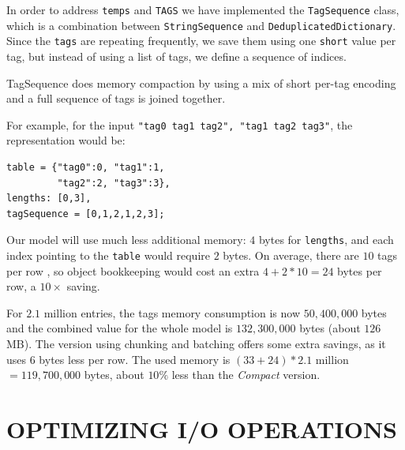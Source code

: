 \documentclass[a4paper,twoside]{article}
\begin{document}
In order to address {\texttt{temps}} and {\texttt{TAGS}} we have implemented the {\texttt{TagSequence}} class, which is a combination between {\texttt{StringSequence}} and {\texttt{DeduplicatedDictionary}}.
Since the {\texttt{tags}} are repeating frequently, we save them using one {\texttt{short}} value per tag, but instead of using a list of tags, we define a sequence of indices.

TagSequence does memory compaction by using a mix of short per-tag encoding and a full sequence of tags is joined together.

For example, for the input {\texttt{"tag0 tag1 tag2", "tag1 tag2 tag3"}}, the representation would be:
\begin{verbatim}
table = {"tag0":0, "tag1":1, 
         "tag2":2, "tag3":3},
lengths: [0,3], 
tagSequence = [0,1,2,1,2,3]; 
\end{verbatim}

Our model will use much less additional memory: $4$ bytes for \texttt{lengths}, and each index pointing to the \texttt{table} would require $2$ bytes. On average, there are $10$ tags per row , so object bookkeeping would cost an extra $4 + 2*10 = 24$ bytes per row, a $10\times$ saving.

For $2.1$ million entries, the tags memory consumption is now $50,400,000$ bytes and the combined value for the whole model is $132,300,000$ bytes (about $126$ MB).
The version using chunking and batching offers some extra savings, as it uses $6$ bytes less per row. The used memory is $(33 + 24) * 2.1$ million $= 119,700,000$ bytes, about $10\%$ less than the {\it Compact} version.








\section{\uppercase{Optimizing I/O Operations}}
\label{io}
\end{document}
